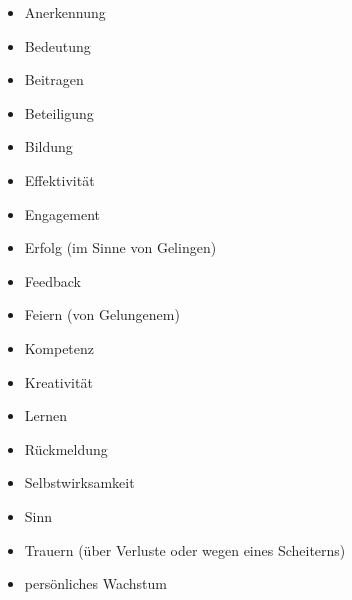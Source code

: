 \begin{multicols}{2}
  \begin{itemize}
    \item Anerkennung
    \item Bedeutung
    \item Beitragen
    \item Beteiligung
    \item Bildung
    \item Effektivität
    \item Engagement
    \item Erfolg (im Sinne von \glqq Gelingen\grqq)
    \item Feedback
    \item Feiern (von Gelungenem)
    \item Kompetenz
    \item Kreativität
    \item Lernen
    \item Rückmeldung
    \item Selbstwirksamkeit
    \item Sinn
    \item Trauern (über Verluste oder wegen eines Scheiterns)
    \item persönliches Wachstum
  \end{itemize}
\end{multicols}
